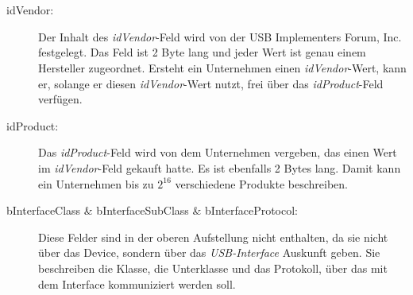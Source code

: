 $ $\\\\\\
\begin{description}
	\item[idVendor: ] Der Inhalt des \textit{idVendor}-Feld wird von der USB Implementers Forum, Inc. festgelegt. Das Feld ist 2 Byte lang und jeder Wert ist genau einem Hersteller zugeordnet. Ersteht ein Unternehmen einen \textit{idVendor}-Wert, kann er, solange er diesen \textit{idVendor}-Wert nutzt, frei über das \textit{idProduct}-Feld verfügen.
	
	\item[idProduct: ] Das \textit{idProduct}-Feld wird von dem Unternehmen vergeben, das einen Wert im \textit{idVendor}-Feld gekauft hatte. Es ist ebenfalls 2 Bytes lang. Damit kann ein Unternehmen bis zu $2^{16}$ verschiedene Produkte beschreiben.
	
	\item[bInterfaceClass \& bInterfaceSubClass \& bInterfaceProtocol: ] Diese Felder sind in der oberen Aufstellung nicht enthalten, da sie nicht über das Device, sondern über das \textit{USB-Interface} Auskunft geben. Sie beschreiben die Klasse, die Unterklasse und das Protokoll, über das mit dem Interface kommuniziert werden soll.
	
\end{description}